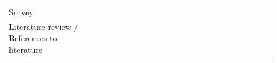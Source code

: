 \documentclass[english, 12pt, a4paper, sci, utf8, a-1b, online]{aaltothesis}
\begin{document}
{\begin{center}
\begin{longtable}{p{0.3\linewidth}p{0.6\linewidth}}
      Survey                                       & \textcite{flow-intrinsic-dx} \newline \textcite{unhappy-developers} \newline \textcite{on-the-unhappiness} \newline \textcite{consequences-of-unhappiness} \newline \textcite{dong2019impact}  \newline \textcite{software-developers-as-users} \newline \textcite{fagerholm2014examining} \newline \textcite{miranda2018improving} \newline \textcite{kuusinen2016software}                                                                                                                                                                                                                                                                                                                                                                                                                                                                                                                                                                       \\
      Literature review / References to literature & \textcite{fagerholm-dx-concept-and-definition} \newline \textcite{henriques2018improving} \newline \textcite{fontao2017investigating} \newline \textcite{chatley2019supporting} \newline \textcite{pinter2019polymorph} \newline \textcite{entering-an-ecosystem} \newline \textcite{fagerholm2014examining} \newline \textcite{fontao2016mseco} \newline \textcite{fontao2015research} \newline \textcite{myers2016improving} \newline \textcite{ekwoge2017tester} \newline \textcite{romano2018effect} \newline \textcite{open-service-innovation} \newline \textcite{de2017towards} \newline \textcite{programmer-experience} \newline \textcite{oran2017set}                                                                                                                                                                                                                                                                                   \\

\end{longtable}
\end{center}}
\end{document}
